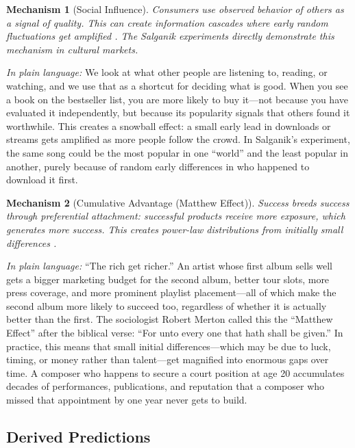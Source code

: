 \documentclass[11pt,a4paper]{article}
\newtheorem{mechanism}{Mechanism}
\begin{document}
\begin{mechanism}[Social Influence]
Consumers use observed behavior of others as a signal of quality. This can create information cascades where early random fluctuations get amplified \citep{bikhchandani1992}. The Salganik experiments directly demonstrate this mechanism in cultural markets.
\end{mechanism}

\noindent\textit{In plain language:} We look at what other people are listening to, reading, or watching, and we use that as a shortcut for deciding what is good. When you see a book on the bestseller list, you are more likely to buy it---not because you have evaluated it independently, but because its popularity signals that others found it worthwhile. This creates a snowball effect: a small early lead in downloads or streams gets amplified as more people follow the crowd. In Salganik's experiment, the same song could be the most popular in one ``world'' and the least popular in another, purely because of random early differences in who happened to download it first.

\begin{mechanism}[Cumulative Advantage (Matthew Effect)]
Success breeds success through preferential attachment: successful products receive more exposure, which generates more success. This creates power-law distributions from initially small differences \citep{merton1968,barabasi1999}.
\end{mechanism}

\noindent\textit{In plain language:} ``The rich get richer.'' An artist whose first album sells well gets a bigger marketing budget for the second album, better tour slots, more press coverage, and more prominent playlist placement---all of which make the second album more likely to succeed too, regardless of whether it is actually better than the first. The sociologist Robert Merton called this the ``Matthew Effect'' after the biblical verse: ``For unto every one that hath shall be given.'' In practice, this means that small initial differences---which may be due to luck, timing, or money rather than talent---get magnified into enormous gaps over time. A composer who happens to secure a court position at age 20 accumulates decades of performances, publications, and reputation that a composer who missed that appointment by one year never gets to build.

\subsection{Derived Predictions}
\end{document}
